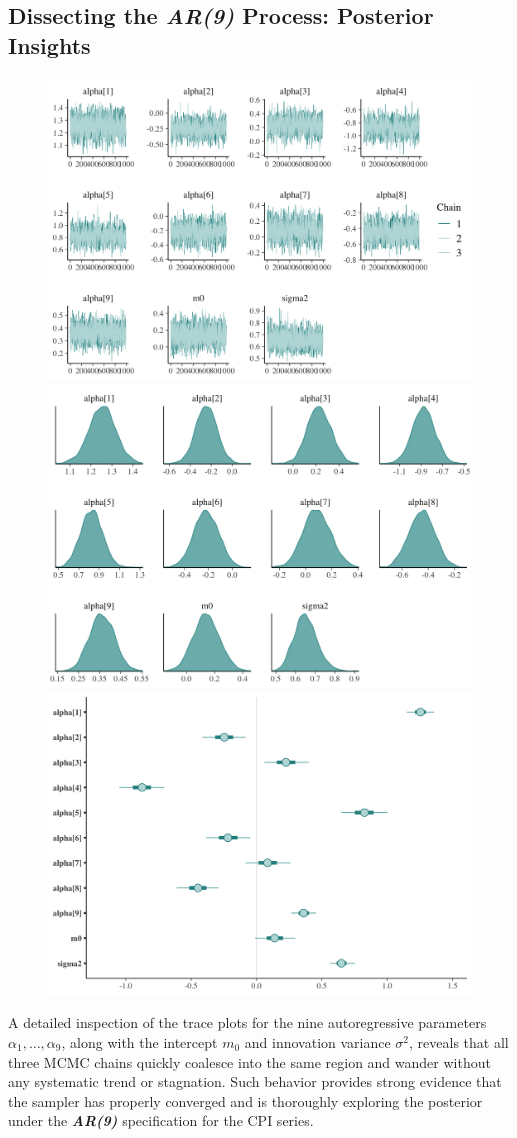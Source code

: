 \documentclass{Configuration_Files/PoliMi3i_thesis}
\begin{document}
\subsection{Dissecting the \textbf{\textit{AR(9)}} Process: Posterior Insights}
\begin{figure}[H]
    \centering
    \includegraphics[width=0.57\linewidth]{AR(9)-trace.png}
    \vspace{0.5em}
    
    \includegraphics[width=0.57\linewidth]{AR(9)-density.png}
    \vspace{0.5em}
    
    \includegraphics[width=0.57\linewidth]{AR(9)-interval.png}
\end{figure}
\newpage
A detailed inspection of the trace plots for the nine autoregressive parameters \(\alpha_1,\dots,\alpha_9\), along with the intercept \(m_0\) and innovation variance \(\sigma^2\), reveals that all three MCMC chains quickly coalesce into the same region and wander without any systematic trend or stagnation. Such behavior provides strong evidence that the sampler has properly converged and is thoroughly exploring the posterior under the \textbf{\textit{AR(9)}} specification for the CPI series.
\end{document}
